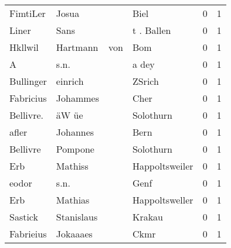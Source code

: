 \begin{center}
\begin{tiny}
\begin{longtabu}{llllrr}
                 FimtiLer &                              Josua &             &                                        Biel &          0 &         1 \\
                    Liner &                               Sans &             &                                  t . Ballen &          0 &         1 \\
                  Hkllwil &                           Hartmann &         von &                                         Bom &          0 &         1 \\
                        A &                               s.n. &             &                                       a dey &          0 &         1 \\
                Bullinger &                            einrich &             &                                      ZSrich &          0 &         1 \\
                Fabricius &                           Johammes &             &                                        Cher &          0 &         1 \\
                Bellivre. &                              äW üe &             &                                   Solothurn &          0 &         1 \\
                    afler &                           Johannes &             &                                        Bern &          0 &         1 \\
                 Bellivre &                            Pompone &             &                                   Solothurn &          0 &         1 \\
                      Erb &                            Mathiss &             &                              Happoltsweiler &          0 &         1 \\
                    eodor &                               s.n. &             &                                        Genf &          0 &         1 \\
                      Erb &                            Mathias &             &                              Happoltsweller &          0 &         1 \\
                  Sastick &                         Stanislaus &             &                                      Krakau &          0 &         1 \\
                Fabrieius &                           Jokaaaes &             &                                        Ckmr &          0 &         1 \\

\end{longtabu}
\end{tiny}
\end{center}
